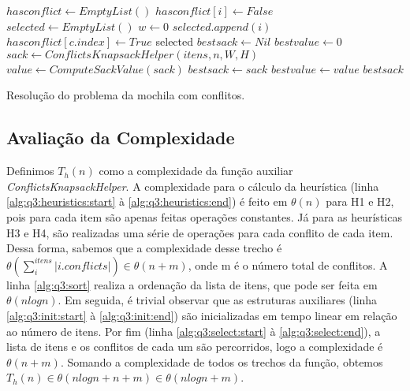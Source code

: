 \documentclass[a4paper]{article}
\newcommand{\algsection}[2]{(linha \ref{alg:#1:#2:start} à \ref{alg:#1:#2:end})}
\begin{document}
\begin{algorithm}[H]
\begin{algorithmic}[1]
  \State {}
     \label{alg:q3:heuristics:start}
    \EndFor \label{alg:q3:heuristics:end}
     \label{alg:q3:sort}
    \State $hasconflict \gets EmptyList()$ \label{alg:q3:init:start}
      \State $hasconflict[i] \gets False$
    \EndFor
    \State $selected \gets EmptyList()$
    \State $w \gets 0$ \label{alg:q3:init:end}
     \label{alg:q3:select:start}
        \State $selected.append(i)$
          \State $hasconflict[c.index] \gets True$
        \EndFor
      \EndIf
    \EndFor \label{alg:q3:select:end}
    \State \Return selected
  \EndFunction
  \State {}
    \State $bestsack \gets Nil$
    \State $bestvalue \gets 0$
      \State $sack \gets ConflictsKnapsackHelper(itens, n, W, H)$
      \State $value \gets ComputeSackValue(sack)$ \label{alg:q3:sackval}
        \State $bestsack \gets sack$
        \State $bestvalue \gets value$
      \EndIf
    \EndFor
    \State \Return $bestsack$
  \EndFunction
\end{algorithmic}
\caption{Resolução do problema da mochila com conflitos.}
\label{alg:q3}
\end{algorithm}

\subsection{Avaliação da Complexidade}

Definimos $T_h(n)$ como a complexidade da função auxiliar \emph{ConflictsKnapsackHelper}. A complexidade para o cálculo da heurística \algsection{q3}{heuristics} é feito em $\theta(n)$ para H1 e H2, pois para cada item são apenas feitas operações constantes. Já para as heurísticas H3 e H4, são realizadas uma série de operações para cada conflito de cada item. Dessa forma, sabemos que a complexidade desse trecho é $\theta(\sum_{i}^{itens}|i.conflicts|) \in \theta(n + m)$, onde m é o número total de conflitos. A linha \ref{alg:q3:sort} realiza a ordenação da lista de itens, que pode ser feita em $\theta(nlogn)$. Em seguida, é trivial observar que as estruturas auxiliares \algsection{q3}{init} são inicializadas em tempo linear em relação ao número de itens. Por fim \algsection{q3}{select}, a lista de itens e os conflitos de cada um são percorridos, logo a complexidade é $\theta(n + m)$. Somando a complexidade de todos os trechos da função, obtemos $T_h(n) \in \theta(nlogn + n + m) \in \theta(nlogn + m)$.
\end{document}

